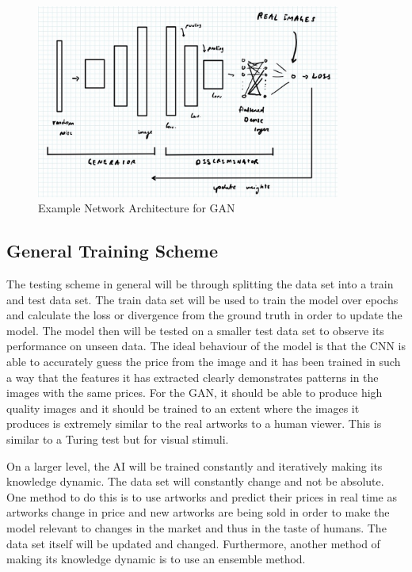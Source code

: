 \documentclass{article}
\begin{document}
\begin{figure}[htp]
    \centering
    \includegraphics[width=10cm]{GAN.jpg}
    \caption{Example Network Architecture for GAN}
    \label{fig:data}
\end{figure}

\subsection{ General Training Scheme}

The testing scheme in general will be through splitting the data set into a train and test data set. The train data set will be used to train the model over epochs and calculate the loss or divergence from the ground truth in order to update the model. The model then will be tested on a smaller test data set to observe its performance on unseen data. The ideal behaviour of the model is that the CNN is able to accurately guess the price from the image and it has been trained in such a way that the features it has extracted clearly demonstrates patterns in the images with the same prices. For the GAN, it should be able to produce high quality images and it should be trained to an extent where the images it produces is extremely similar to the real artworks to a human viewer. This is similar to a Turing test but for visual stimuli. \newline 

On a larger level, the AI will be trained constantly and iteratively making its knowledge dynamic. The data set will constantly change and not be absolute. One method to do this is to use artworks and predict their prices in real time as artworks change in price and new artworks are being sold in order to make the model relevant to changes in the market and thus in the taste of humans. The data set itself will be updated and changed. Furthermore, another method of making its knowledge dynamic is to use an ensemble method. \newline 
\end{document}
